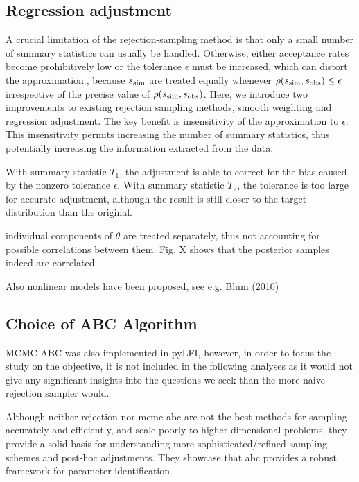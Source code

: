 \subsection{Regression adjustment}

A crucial limitation of the rejection-sampling method is that only a small number of summary statistics can usually be handled. Otherwise, either acceptance rates become prohibitively low or the tolerance $\epsilon$ must be increased, which can distort the approximation., because $s_\mathrm{sim}$ are treated equally whenever $\rho \qty(s_\mathrm{sim}, s_\mathrm{obs}) \leq \epsilon$ irrespective of the precise value of $\rho \qty(s_\mathrm{sim}, s_\mathrm{obs})$. Here, we introduce two improvements to existing rejection sampling methods, smooth weighting and regression adjustment. The key benefit is insensitivity of the approximation to $\epsilon$. This insensitivity permits increasing the number of summary statistics, thus potentially increasing the information extracted from the data. 

With summary statistic $T_1$, the adjustment is able to correct for the bias caused by the nonzero tolerance $\epsilon$. With summary statistic $T_2$, the tolerance is too large for accurate adjustment, although the result is still closer to the target distribution than the original.

individual components of $\theta$ are treated separately, thus not accounting for possible correlations between them. Fig. X shows that the posterior samples indeed are correlated.

Also nonlinear models have been proposed, see e.g. Blum (2010)

\subsection{Choice of ABC Algorithm}

MCMC-ABC was also implemented in pyLFI, however, in order to focus the study on the objective, it is not included in the following analyses as it would not give any significant insights into the questions we seek than the more naive rejection sampler would. 

Although neither rejection nor mcmc abc are not the best methods for sampling accurately and efficiently, and scale poorly to higher dimensional problems, they provide a solid basis for understanding more sophisticated/refined sampling schemes and post-hoc adjustments. They showcase that abc provides a robust framework for parameter identification

